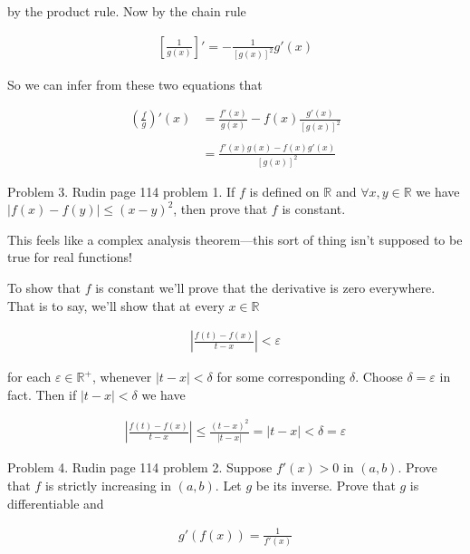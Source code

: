 \documentclass{article}
\begin{document}
  by the product rule.  Now by the chain rule

  \begin{align*}
    \left[\frac 1 {g(x)} \right]' = -\frac{1}{[g(x)]^2}g'(x)
  \end{align*}

  So we can infer from these two equations that

  \begin{align*}
    \left(\frac f g \right)'(x) &= \frac{f'(x)}{g(x)}-f(x)\frac{g'(x)}{[g(x)]^2} \\\\
    &= \frac{f'(x)g(x)-f(x)g'(x)}{[g(x)]^2}
  \end{align*}

  \pagebreak

  {\Large \color{Sepia} Problem 3. Rudin page 114 problem 1. If $f$ is defined on $\mathbb R$ and $\forall x,y \in \mathbb R$ we have $|f(x)-f(y)|\leq (x-y)^2$, then prove that $f$ is constant.}

  \vspace{1cm}

  This feels like a complex analysis theorem---this sort of thing isn't supposed to be true for real functions! \smiley{}

  To show that $f$ is constant we'll prove that the derivative is zero everywhere.  That is to say, we'll show that at every $x\in \mathbb R$

  \begin{align*}
    \left|\frac{f(t)-f(x)}{t-x}\right| < \varepsilon
  \end{align*}

  for each $\varepsilon\in\mathbb R^+$, whenever $|t-x|<\delta$ for some corresponding $\delta$.  Choose $\delta = \varepsilon$ in fact.  Then if $|t-x| < \delta$ we have

  \begin{align*}
    \left|\frac{f(t)-f(x)}{t-x}\right|\leq \frac{(t-x)^2}{|t-x|} =|t-x| < \delta = \varepsilon
  \end{align*}

  \pagebreak

  {\Large \color{Sepia} Problem 4. Rudin page 114 problem 2. Suppose $f'(x)>0$ in $(a,b)$.  Prove that $f$ is strictly increasing in $(a,b)$.  Let $g$ be its inverse.  Prove that $g$ is differentiable and

  \begin{align*}
    g'(f(x)) = \frac{1}{f'(x)}
  \end{align*}
  }
\end{document}
